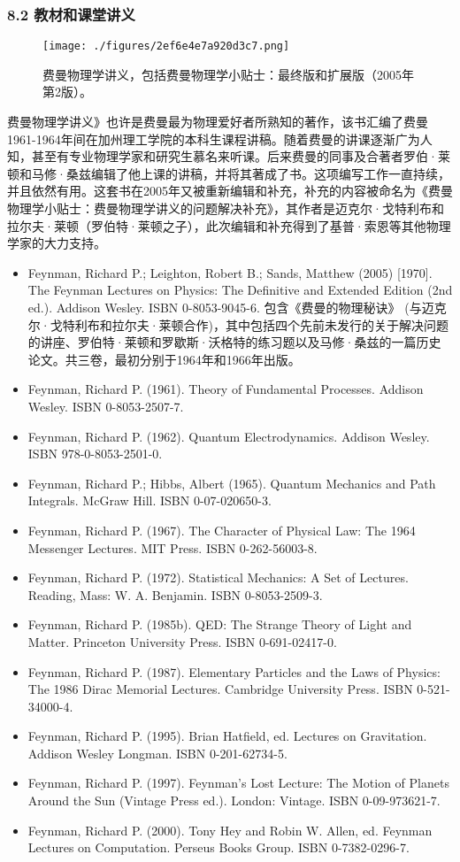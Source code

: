 \subsubsection{8.2 教材和课堂讲义}
\begin{figure}[ht]
\centering
\texttt{[image: ./figures/2ef6e4e7a920d3c7.png]}
\caption{费曼物理学讲义，包括费曼物理学小贴士：最终版和扩展版（2005年第2版）。} \label{fig_Feynma_7}
\end{figure}
费曼物理学讲义》也许是费曼最为物理爱好者所熟知的著作，该书汇编了费曼1961-1964年间在加州理工学院的本科生课程讲稿。随着费曼的讲课逐渐广为人知，甚至有专业物理学家和研究生慕名来听课。后来费曼的同事及合著者罗伯·莱顿和马修·桑兹编辑了他上课的讲稿，并将其著成了书。这项编写工作一直持续，并且依然有用。这套书在2005年又被重新编辑和补充，补充的内容被命名为《费曼物理学小贴士：费曼物理学讲义的问题解决补充》，其作者是迈克尔·戈特利布和拉尔夫·莱顿（罗伯特·莱顿之子），此次编辑和补充得到了基普·索恩等其他物理学家的大力支持。
\begin{itemize}
\item Feynman, Richard P.; Leighton, Robert B.; Sands, Matthew (2005) [1970]. The Feynman Lectures on Physics: The Definitive and Extended Edition (2nd ed.). Addison Wesley. ISBN 0-8053-9045-6. 包含《费曼的物理秘诀》 (与迈克尔·戈特利布和拉尔夫·莱顿合作)，其中包括四个先前未发行的关于解决问题的讲座、罗伯特·莱顿和罗歇斯·沃格特的练习题以及马修·桑兹的一篇历史论文。共三卷，最初分别于1964年和1966年出版。
\item Feynman, Richard P. (1961). Theory of Fundamental Processes. Addison Wesley. ISBN 0-8053-2507-7.
\item Feynman, Richard P. (1962). Quantum Electrodynamics. Addison Wesley. ISBN 978-0-8053-2501-0.
\item Feynman, Richard P.; Hibbs, Albert (1965). Quantum Mechanics and Path Integrals. McGraw Hill. ISBN 0-07-020650-3.
\item Feynman, Richard P. (1967). The Character of Physical Law: The 1964 Messenger Lectures. MIT Press. ISBN 0-262-56003-8.
\item Feynman, Richard P. (1972). Statistical Mechanics: A Set of Lectures. Reading, Mass: W. A. Benjamin. ISBN 0-8053-2509-3.
\item Feynman, Richard P. (1985b). QED: The Strange Theory of Light and Matter. Princeton University Press. ISBN 0-691-02417-0.
\item Feynman, Richard P. (1987). Elementary Particles and the Laws of Physics: The 1986 Dirac Memorial Lectures. Cambridge University Press. ISBN 0-521-34000-4.
\item Feynman, Richard P. (1995). Brian Hatfield, ed. Lectures on Gravitation. Addison Wesley Longman. ISBN 0-201-62734-5.
\item Feynman, Richard P. (1997). Feynman's Lost Lecture: The Motion of Planets Around the Sun (Vintage Press ed.). London: Vintage. ISBN 0-09-973621-7.
\item Feynman, Richard P. (2000). Tony Hey and Robin W. Allen, ed. Feynman Lectures on Computation. Perseus Books Group. ISBN 0-7382-0296-7.
\end{itemize}

